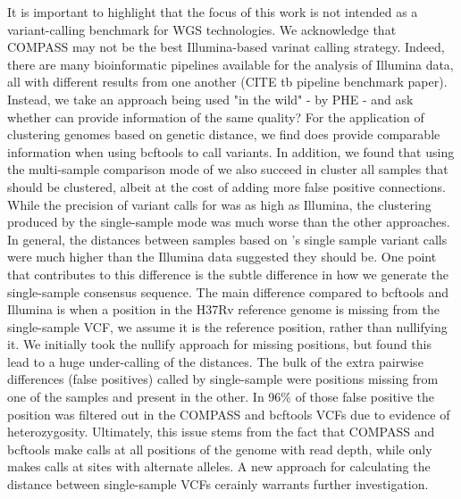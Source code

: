 It is important to highlight that the focus of this work is not intended as a variant-calling benchmark for WGS technologies. We acknowledge that COMPASS may not be the best Illumina-based varinat calling strategy. Indeed, there are many bioinformatic pipelines available for the analysis of \mtb{} Illumina data, all with different results from one another (CITE tb pipeline benchmark paper). Instead, we take an approach being used "in the wild" - by PHE - and ask whether \ont{} can provide information of the same quality? For the application of clustering genomes based on genetic distance, we find \ont{} does provide comparable information when using bcftools to call variants. In addition, we found that using the multi-sample comparison mode of \pandora{} we also succeed in cluster all samples that should be clustered, albeit at the cost of adding more false positive connections. While the precision of variant calls for \pandora{} was as high as Illumina, the clustering produced by the single-sample mode was much worse than the other approaches. In general, the distances between samples based on \pandora{}'s single sample variant calls were much higher than the Illumina data suggested they should be. One point that contributes to this difference is the subtle difference in how we generate the \pandora{} single-sample consensus sequence. The main difference compared to bcftools and Illumina is when a position in the H37Rv reference genome is missing from the \pandora{} single-sample VCF, we assume it is the reference position, rather than nullifying it. We initially took the nullify approach for missing positions, but found this lead to a huge under-calling of the distances. The bulk of the extra pairwise differences (false positives) called by \pandora{} single-sample were positions missing from one of the samples and present in the other. In 96\% of those false positive the position was filtered out in the COMPASS and bcftools VCFs due to evidence of heterozygosity. Ultimately, this issue stems from the fact that COMPASS and bcftools make calls at all positions of the genome with read depth, while \pandora{} only makes calls at sites with alternate alleles. A new approach for calculating the distance between \pandora{} single-sample VCFs cerainly warrants further investigation.
